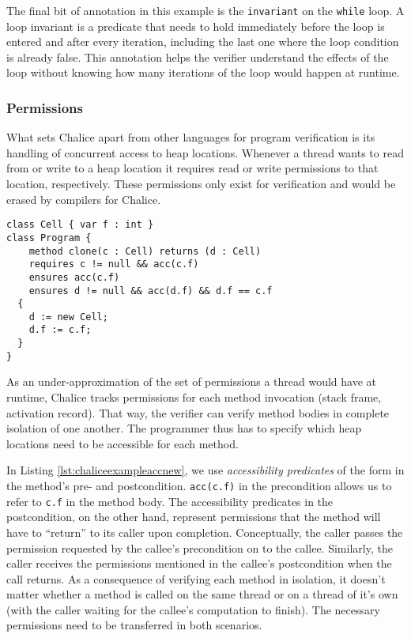 The final bit of annotation in this example is the \lstinline[language=Chalice]!invariant! on the \lstinline[language=Chalice]!while! loop. 
A loop invariant is a predicate that needs to hold immediately before the loop is entered and after every iteration, including the last one where the loop condition is already false.
This annotation helps the verifier understand the effects of the loop without knowing how many iterations of the loop would happen at runtime.

\subsubsection{Permissions}

What sets Chalice apart from other languages for program verification is its handling of concurrent access to heap locations. 
Whenever a thread wants to read from or write to a heap location it requires read or write permissions to that location, respectively.
These permissions only exist for verification and would be erased by compilers for Chalice.

\begin{lstlisting}[language=Chalice,float,caption={Chalice example of object creation and (write) accessibility predicates.},label={lst:chaliceexampleaccnew}]
class Cell { var f : int }
class Program {
 	method clone(c : Cell) returns (d : Cell)
    requires c != null && acc(c.f)
    ensures acc(c.f)
    ensures d != null && acc(d.f) && d.f == c.f
  {
    d := new Cell;
    d.f := c.f;
  }
}
\end{lstlisting}

As an under-approximation of the set of permissions a thread would have at runtime, Chalice tracks permissions for each method invocation (stack frame, activation record). 
That way, the verifier can verify method bodies in complete isolation of one another. 
The programmer thus has to specify which heap locations need to be accessible for each method.

In Listing \ref{lst:chaliceexampleaccnew}, we use \emph{accessibility predicates} of the form  in the method's pre- and postcondition. 
\lstinline!acc(c.f)! in the precondition allows us to refer to \lstinline!c.f! in the method body. 
The accessibility predicates in the postcondition, on the other hand, represent permissions that the method will have to ``return'' to its caller upon completion.
Conceptually, the caller passes the permission requested by the callee's precondition on to the callee.
Similarly, the caller receives the permissions mentioned in the callee's postcondition when the call returns.
As a consequence of verifying each method in isolation, it doesn't matter whether a method is called on the same thread or on a thread of it's own (with the caller waiting for the callee's computation to finish). 
The necessary permissions need to be transferred in both scenarios.

